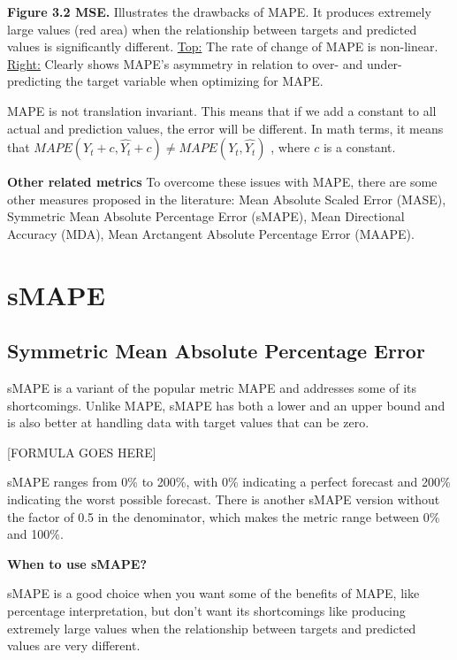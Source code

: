 \textbf{Figure 3.2 MSE.} Illustrates the drawbacks of MAPE. It produces extremely large values (red area) when the relationship between
targets and predicted values is significantly different. \underline{Top:} The rate of change of MAPE is non-linear.
\underline{Right:} Clearly shows MAPE's asymmetry in relation to over- and under-predicting the target variable when optimizing for MAPE.

{MAPE is not translation invariant. This means that if we add a constant to all actual and prediction values, the error will be different.
In math terms, it means that $MAPE(Y_{t} + c, \hat{Y_{t}} + c) \not= MAPE(Y_{t}, \hat{Y_{t}})$ , where $c$ is a constant.}


\textbf{Other related metrics}
To overcome these issues with MAPE, there are some other measures proposed in the literature: Mean Absolute Scaled Error (MASE),
Symmetric Mean Absolute Percentage Error (sMAPE), Mean Directional Accuracy (MDA), Mean Arctangent Absolute Percentage Error (MAAPE).

\clearpage
\thispagestyle{regressionstyle}
\section{sMAPE}
\subsection{Symmetric Mean Absolute Percentage Error}

sMAPE is a variant of the popular metric MAPE and addresses some of its shortcomings. Unlike MAPE, sMAPE has both a lower and an upper bound and is also better
at handling data with target values that can be zero.

\begin{center}
    [FORMULA GOES HERE]
\end{center}

sMAPE ranges from 0\% to 200\%, with 0\% indicating a perfect forecast and 200\% indicating the worst possible forecast. There is another sMAPE version without the factor of 0.5 in the denominator, which makes the metric range between 0\% and 100\%.

\textbf{When to use sMAPE?}

sMAPE is a good choice when you want some of the benefits of MAPE, like percentage interpretation, but don't want its shortcomings like producing extremely large values when the relationship between
targets and predicted values are very different.

